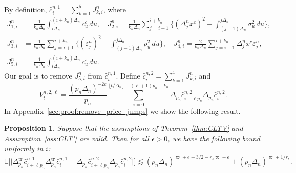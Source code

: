 \documentclass[ecta,nameyear,draft]{econsocart}
\newtheorem{prop}[theorem]{Proposition}
\def\wt{\widetilde}
\def\wh{\widehat}
\newcommand{\1}{\mathbf 1}
\def\E{\mathbb{E}}
\numberwithin{equation}{section}
\begin{document}
\begin{appendix}
	 
\noindent By definition, $
\wh c^{n,1}_i
= \sum_{k=1}^5
J_{k,i}^{n}
$,
where
\begin{align}\nonumber
	J_{1,i}^{n} &= \frac{1}{k_n\Delta_n} \int_{i\Delta_n}^{(i+k_n)\Delta_n} c^c_u \, du,
	\quad J_{2,i}^{n} =
	\frac{1}{k_n\Delta_n}\sum_{j=i+1}^{i+k_n} \Big\{ (\Delta^n_j x^c )^2 - \int_{(j-1)\Delta_n}^{j\Delta_n} \sigma_u^2\, du \Big\},
	\\
	J_{3,i}^{n} &=
	\frac{1}{k_n\Delta_n} \sum_{j=i+1}^{i+k_n} \Big\{ 
	( \varepsilon_j^{n})^2  - \int_{(j-1)\Delta_n}^{j\Delta_n} \rho_u^2\, du 
	\Big \},\quad J_{4,i}^{n} =
	\frac{2}{k_n\Delta_n} \sum_{j=i+1}^{i+k_n} 
	\Delta^n_j x^c    \varepsilon_j^{n}, \label{eq:J} \\
	J_{5,i}^{n}  &= \frac{1}{k_n\Delta_n} \int_{i\Delta_n}^{(i+k_n)\Delta_n} c^{s}_u\, du.\nonumber
\end{align}
Our goal is to remove $J^n_{5,i}$ from $\wh c^{n,1}_i$. Define $
	\wh c^{n,2}_i
	=
\sum_{k=1}^4
	J_{k,i}^{n}
$
and
\begin{equation}\label{eq:V2}
	V^{n,2,\ell}_t
	=
	\frac{(p_n\Delta_n)^{-2e}}{p_n}
	\sum_{i=0}^{\lfloor t/\Delta_n \rfloor - (\ell + 1) p_n-k_n}
	\Delta_{p_n} \wh c^{n,2}_{i+\ell p_n}\Delta_{p_n}  \wh c^{n,2}_i.
\end{equation}
In Appendix~\ref{sec:proof:remove_price_jumps} we show the following result.


\begin{prop}
\label{prop:remove_vol_jumps}
Suppose that  the assumptions of Theorem~\ref{thm:CLTV} and Assumption~\ref{ass:CLT'} are valid.  Then for all $\epsilon > 0$, we have the following bound uniformly in $i$:
\begin{equation*}
\E\big[\big| \Delta_{p_n}^{\mathrm{tr}} \wh c^{n,1}_{i+\ell p_n}\Delta_{p_n}^{\mathrm{tr}} \wh c^{n,1}_i- 	\Delta_{p_n} \wh c^{n,2}_{i+\ell p_n}\Delta_{p_n}  \wh c^{n,2}_i
\big|\big] 
\lesssim
(p_n\Delta_n)^{\wt\varpi+e+3/2-r_s\wt\varpi - \epsilon} 
+ 
(p_n\Delta_n)^{\wt \varpi+1/r_s}.
\end{equation*}
\end{prop}


\end{appendix}
\end{document}
